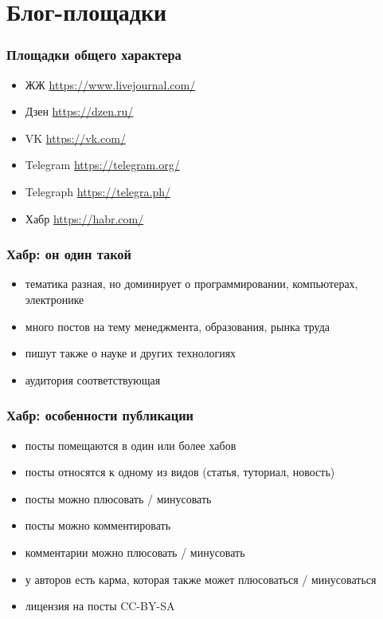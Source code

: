 \documentclass[14pt]{beamer}
\begin{document}
\section{Блог-площадки}

\begin{frame}
  \frametitle{Площадки общего характера}
  \begin{itemize}
  \item ЖЖ \url{https://www.livejournal.com/}
  \item Дзен \url{https://dzen.ru/}
  \item VK \url{https://vk.com/}
  \item Telegram \url{https://telegram.org/}
  \item Telegraph \url{https://telegra.ph/}
  \item Хабр \url{https://habr.com/}
  \end{itemize}
\end{frame}

\begin{frame}
  \frametitle{Хабр: он один такой}
  \begin{itemize}
  \item тематика разная, но доминирует о программировании, компьютерах, электронике
  \item много постов на тему менеджмента, образования, рынка труда
  \item пишут также о науке и других технологиях
  \item аудитория соответствующая
  \end{itemize}
\end{frame}

\begin{frame}
  \frametitle{Хабр: особенности публикации}
  \begin{itemize}
  \item посты помещаются в один или более хабов
  \item посты относятся к одному из видов (статья, туториал, новость)
  \item посты можно плюсовать / минусовать
  \item посты можно комментировать
  \item комментарии можно плюсовать / минусовать
  \item у авторов есть карма, которая также может плюсоваться / минусоваться
  \item лицензия на посты CC-BY-SA
  \end{itemize}
\end{frame}
\end{document}

